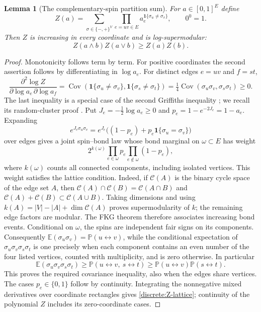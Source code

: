 \documentclass[11pt]{article}
\newtheorem{lemma}[theorem]{Lemma}
\theoremstyle{definition}
\theoremstyle{remark}
\numberwithin{equation}{section}
\begin{document}
\begin{lemma}[The complementary-spin partition sum]
\label{discrete:ising-partition}
For $a\in[0,1]^E$ define
\begin{equation}\label{discrete:ising-Z}
 Z(a)=\sum_{\sigma\in\{-,+\}^{V}}
             \prod_{e=uv\in E}a_e^{\mathbf 1\{\sigma_u\ne\sigma_v\}},
 \qquad 0^0=1.
\end{equation}
Then $Z$ is increasing in every coordinate and is log-supermodular:
\begin{equation}\label{discrete:Z-lattice}
 Z(a\wedge b)Z(a\vee b)\ge Z(a)Z(b).
\end{equation}
\end{lemma}
\begin{proof}
Monotonicity follows term by term.  For positive coordinates the second assertion follows by differentiating in $\log a_e$.
For distinct edges $e=uv$ and $f=st$,
\[
 \frac{\partial^2\log Z}{\partial\log a_e\,\partial\log a_f}
 =\operatorname{Cov}(\mathbf 1\{\sigma_u\ne\sigma_v\},
              \mathbf 1\{\sigma_s\ne\sigma_t\})
 =\tfrac14\operatorname{Cov}(\sigma_u\sigma_v,\sigma_s\sigma_t)\ge0.
\]
The last inequality is a special case of the second Griffiths inequality
\cite{GKS1968}; we recall its random-cluster proof \cite[p.~102]{FKG1971}. Put
$J_e=-\frac12\log a_e\ge0$ and $p_e=1-e^{-2J_e}=1-a_e$. Expanding
\[
 e^{J_e\sigma_u\sigma_v}
 =e^{J_e}\bigl((1-p_e)+p_e\mathbf 1\{\sigma_u=\sigma_v\}\bigr)
\]
over edges gives a joint spin--bond law whose bond marginal on
$\omega\subset E$ has weight
\[
 2^{k(\omega)}\prod_{e\in\omega}p_e
                    \prod_{e\notin\omega}(1-p_e),
\]
where $k(\omega)$ counts all connected components, including isolated
vertices. This weight satisfies the lattice condition. Indeed, if
$\mathcal C(A)$ is the binary cycle space of the edge set $A$, then
$\mathcal C(A)\cap\mathcal C(B)=\mathcal C(A\cap B)$ and
$\mathcal C(A)+\mathcal C(B)\subset\mathcal C(A\cup B)$.
Taking dimensions and using
$k(A)=|V|-|A|+\dim\mathcal C(A)$ proves supermodularity of $k$;
the remaining edge factors are modular. The FKG theorem
\cite{FKG1971} therefore associates increasing bond events.
Conditional on $\omega$, the spins are independent fair signs on its
components. Consequently
$\mathbb E(\sigma_u\sigma_v)=\mathbb P(u\leftrightarrow v)$, while the
conditional expectation of $\sigma_u\sigma_v\sigma_s\sigma_t$ is
one precisely when each component contains an even number of the four
listed vertices, counted with multiplicity, and is zero otherwise. In
particular
\[
 \mathbb E(\sigma_u\sigma_v\sigma_s\sigma_t)
 \ge\mathbb P(u\leftrightarrow v,\ s\leftrightarrow t)
 \ge\mathbb P(u\leftrightarrow v)\mathbb P(s\leftrightarrow t).
\]
This proves the required covariance inequality, also when the edges share
vertices. The cases $p_e\in\{0,1\}$ follow by continuity. Integrating
the nonnegative mixed derivatives over coordinate rectangles gives
\eqref{discrete:Z-lattice}; continuity of the polynomial $Z$ includes its
zero-coordinate cases.

\end{proof}
\end{document}
